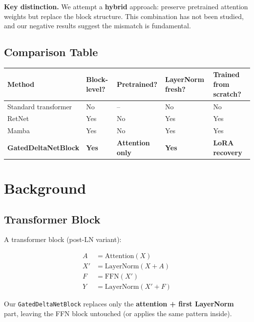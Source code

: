 \textbf{Key distinction.} We attempt a \textbf{hybrid} approach: preserve pretrained 
attention weights but replace the block structure. This combination has 
not been studied, and our negative results suggest the mismatch is 
fundamental.



\subsection{Comparison Table}

\begin{table}[H]
\centering
\small
\begin{tabular}{lllll}
\toprule
\textbf{Method} & \textbf{Block-level?} & \textbf{Pretrained?} & \textbf{LayerNorm fresh?} & \textbf{Trained from scratch?} \\
\midrule
Standard transformer & No & -- & No & No \\
RetNet & Yes & No & Yes & Yes \\
Mamba & Yes & No & Yes & Yes \\
\textbf{GatedDeltaNetBlock} & \textbf{Yes} & \textbf{Attention only} & \textbf{Yes} & \textbf{LoRA recovery} \\
\bottomrule
\end{tabular}
\end{table}




\section{Background}

\subsection{Transformer Block}

A transformer block (post-LN variant):

\[
\begin{aligned}
A &= \text{Attention}(X) \\
X' &= \text{LayerNorm}(X + A) \\
F &= \text{FFN}(X') \\
Y &= \text{LayerNorm}(X' + F)
\end{aligned}
\tag{3.1}
\]

Our \texttt{GatedDeltaNetBlock} replaces only the \textbf{attention + first LayerNorm} 
part, leaving the FFN block untouched (or applies the same pattern inside).

